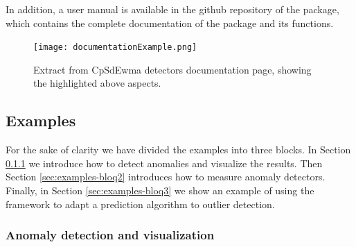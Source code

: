 \documentclass[a4paper]{article}\usepackage[]{graphicx}\usepackage[]{color}
\begin{document}
In addition, a user manual is available in the github repository of the   package, which contains the complete documentation of the package and its functions.

\begin{figure}[htbp]
\centering
\texttt{[image: documentationExample.png]}
\caption{Extract from CpSdEwma detectors documentation page, showing the highlighted above aspects.}
\label{fig:documentation}
\end{figure}

\newpage

\subsection{Examples}\label{sec:examples}

For the sake of clarity we have divided the examples into three blocks. In Section \ref{sec:examples-bloq1} we introduce how to detect anomalies and visualize the results. Then Section \ref{sec:examples-bloq2} introduces how to measure anomaly detectors. Finally, in Section \ref{sec:examples-bloq3} we show an example of using the framework to adapt a prediction algorithm to outlier detection.

\subsubsection{Anomaly detection and visualization}\label{sec:examples-bloq1}
\end{document}
